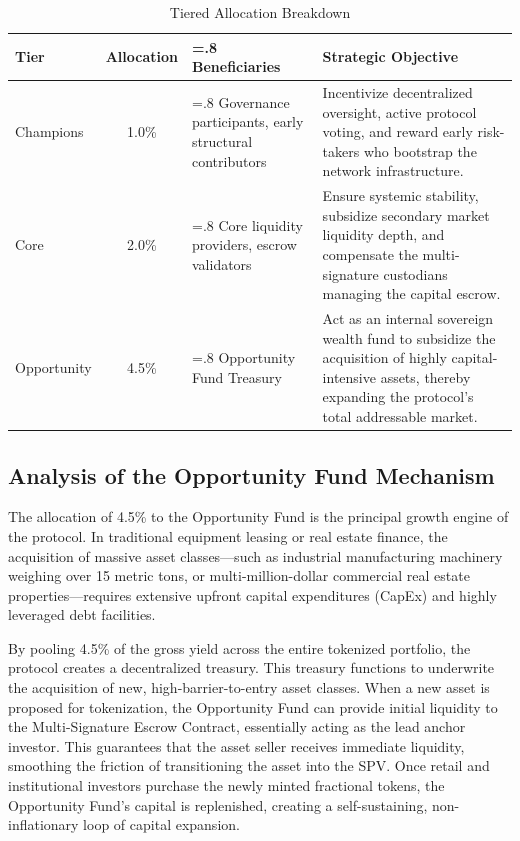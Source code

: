 \documentclass[12pt, a4paper]{article}
\begin{document}
\begin{table}[htbp]
\centering
\renewcommand{\arraystretch}{1.5}
\begin{tabularx}{\textwidth}{lc>{\hsize=.8\hsize}X>{\hsize=1.2\hsize}X}
\toprule
\textbf{Tier} & \textbf{Allocation} & \textbf{Beneficiaries} & \textbf{Strategic Objective} \\
\midrule
Champions & 1.0\% & Governance participants, early structural contributors & Incentivize decentralized oversight, active protocol voting, and reward early risk-takers who bootstrap the network infrastructure. \\
Core & 2.0\% & Core liquidity providers, escrow validators & Ensure systemic stability, subsidize secondary market liquidity depth, and compensate the multi-signature custodians managing the capital escrow. \\
Opportunity & 4.5\% & Opportunity Fund Treasury & Act as an internal sovereign wealth fund to subsidize the acquisition of highly capital-intensive assets, thereby expanding the protocol's total addressable market. \\
\bottomrule
\end{tabularx}
\caption{Tiered Allocation Breakdown}
\end{table}

\subsection{Analysis of the Opportunity Fund Mechanism}
The allocation of 4.5\% to the Opportunity Fund is the principal growth engine of the protocol. In traditional equipment leasing or real estate finance, the acquisition of massive asset classes—such as industrial manufacturing machinery weighing over 15 metric tons, or multi-million-dollar commercial real estate properties—requires extensive upfront capital expenditures (CapEx) and highly leveraged debt facilities.

By pooling 4.5\% of the gross yield across the entire tokenized portfolio, the protocol creates a decentralized treasury. This treasury functions to underwrite the acquisition of new, high-barrier-to-entry asset classes. When a new asset is proposed for tokenization, the Opportunity Fund can provide initial liquidity to the Multi-Signature Escrow Contract, essentially acting as the lead anchor investor. This guarantees that the asset seller receives immediate liquidity, smoothing the friction of transitioning the asset into the SPV. Once retail and institutional investors purchase the newly minted fractional tokens, the Opportunity Fund's capital is replenished, creating a self-sustaining, non-inflationary loop of capital expansion.
\end{document}
